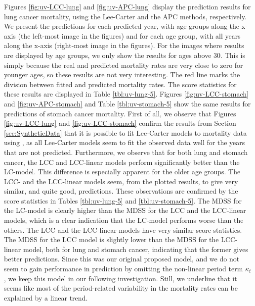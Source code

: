 \newpar Figures \ref{fig:uv-LCC-lung} and \ref{fig:uv-APC-lung} display the prediction results for lung cancer mortality, using the Lee-Carter and the APC methods, respectively. We present the predictions for each predicted year, with age groups along the x-axis (the left-most image in the figures) and for each age group, with all years along the x-axis (right-most image in the figures). For the images where results are displayed by age groups, we only show the results for ages above 30. This is simply because the real and predicted mortality rates are very close to zero for younger ages, so these results are not very interesting. The red line marks the division between fitted and predicted mortality rates. The score statistics for these results are displayed in Table \ref{tbl:uv-lung-5}. Figures \ref{fig:uv-LCC-stomach} and \ref{fig:uv-APC-stomach} and Table \ref{tbl:uv-stomach-5} show the same results for predictions of stomach cancer mortality. 
\newpar
First of all, we observe that Figures \ref{fig:uv-LCC-lung} and \ref{fig:uv-LCC-stomach} confirm the results from Section \ref{sec:SyntheticData} that it is possible to fit Lee-Carter models to mortality data using \inlabru, as all Lee-Carter models seem to fit the observed data well for the years that are not predicted. Furthermore, we observe that for both lung and stomach cancer, the LCC and LCC-linear models perform significantly better than the LC-model. This difference is especially apparent for the older age groups. The LCC- and the LCC-linear models seem, from the plotted results, to give very similar, and quite good, predictions. These observations are confirmed by the score statistics in Tables \ref{tbl:uv-lung-5} and \ref{tbl:uv-stomach-5}. The MDSS for the LC-model is clearly higher than the MDSS for the LCC and the LCC-linear models, which is a clear indication that the LC-model performs worse than the others. \textcolor{myDarkGreen}{The LCC and the LCC-linear models have very similar score statistics. The MDSS for the LCC model is slightly lower than the MDSS for the LCC-linear model, both for lung and stomach cancer, indicating that the former gives better predictions. Since this was our original proposed model, and we do not seem to gain performance in prediction by omitting the non-linear period term $\kappa_t$, we keep this model in our following investigation. Still, we underline that it seems like most of the period-related variability in the mortality rates can be explained by a linear trend. }

